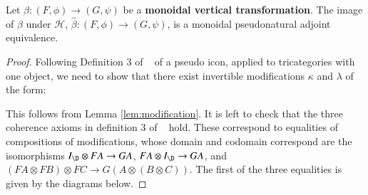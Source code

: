 \begin{lem}\label{lem:montran}
Let $\beta: (F, \phi) \rightarrow (G,\psi)$ be a {\bf monoidal vertical transformation}. The image of $\beta$ under $\mathcal{H}$, $\hat{\beta}: (F, \phi) \rightarrow (G,\psi)$, is a monoidal pseudonatural adjoint equivalence.
\end{lem}

\begin{proof}
Following Definition 3 of ~\cite{gg:ldstr-tricat} of a pseudo icon, applied to tricategories with one object, we need to show that there exist invertible modifications $\kappa$ and $\lambda$ of the form:

\hspace{1cm}

This follows from Lemma \ref{lem:modification}. 
It is left to check that the three coherence axioms in definition 3 of ~\cite{gg:ldstr-tricat} hold. These correspond to equalities of compositions of modifications, whose domain and codomain correspond are the isomorphisms $I_{\D} \otimes FA \rightarrow GA$, $FA \otimes I_{\D} \rightarrow GA$, and $(FA \otimes FB) \otimes FC \rightarrow G(A \otimes (B \otimes C))$.
The first of the three equalities is given by the diagrams below.


\end{proof}
